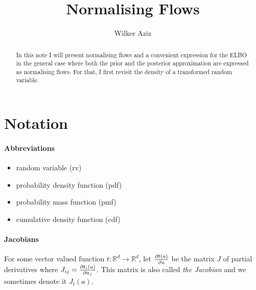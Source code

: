 \documentclass{article}
\title{Normalising Flows}
\author{Wilker Aziz}
\newcommand{\jac}[2]{J_{#1}(#2)}
\begin{document}
\maketitle

\begin{abstract}
    In this note I will present normalising flows and a convenient expression for the ELBO in the general case where both the prior and the posterior approximation are expressed as normalising flows. For that, I first revisit the density of a transformed random variable.
\end{abstract}
\tableofcontents



\section*{Notation}

\paragraph{Abbreviations} 
\begin{itemize}
    \item random variable (rv)
    \item probability density function (pdf)
    \item probability mass function (pmf)
    \item cumulative density function (cdf)
\end{itemize}

\paragraph{Jacobians} For some vector valued function $t: \mathbb R^d \to \mathbb R^d$, let $\pdv{t(a)}{a}$ be the matrix $J$ of partial derivatives where $J_{ij} = \pdv{t_i(a)}{a_j}$.
This matrix is also called \emph{the Jacobian} and we sometimes denote it $\jac{t}{a}$.

\pagebreak








\end{document}
